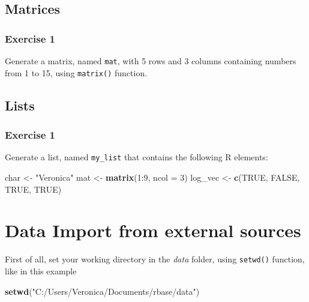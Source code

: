 \documentclass[]{book}
\newenvironment{Shaded}{\begin{snugshade}}{\end{snugshade}}
\newcommand{\KeywordTok}[1]{\textcolor[rgb]{0.13,0.29,0.53}{\textbf{{#1}}}}
\newcommand{\DataTypeTok}[1]{\textcolor[rgb]{0.13,0.29,0.53}{{#1}}}
\newcommand{\DecValTok}[1]{\textcolor[rgb]{0.00,0.00,0.81}{{#1}}}
\newcommand{\StringTok}[1]{\textcolor[rgb]{0.31,0.60,0.02}{{#1}}}
\newcommand{\OtherTok}[1]{\textcolor[rgb]{0.56,0.35,0.01}{{#1}}}
\newcommand{\NormalTok}[1]{{#1}}
\begin{document}
\section{Matrices}\label{matrices}

\subsection{Exercise 1}\label{exercise-1-3}

Generate a matrix, named \texttt{mat}, with 5 rows and 3 columns
containing numbers from 1 to 15, using \texttt{matrix()} function.

\section{Lists}\label{lists}

\subsection{Exercise 1}\label{exercise-1-4}

Generate a list, named \texttt{my\_list} that contains the following R
elements:

\begin{Shaded}
\begin{Highlighting}[]
\NormalTok{char <-}\StringTok{ "Veronica"}
\NormalTok{mat <-}\StringTok{ }\KeywordTok{matrix}\NormalTok{(}\DecValTok{1}\NormalTok{:}\DecValTok{9}\NormalTok{, }\DataTypeTok{ncol =} \DecValTok{3}\NormalTok{)}
\NormalTok{log_vec <-}\StringTok{ }\KeywordTok{c}\NormalTok{(}\OtherTok{TRUE}\NormalTok{, }\OtherTok{FALSE}\NormalTok{, }\OtherTok{TRUE}\NormalTok{, }\OtherTok{TRUE}\NormalTok{)}
\end{Highlighting}
\end{Shaded}

\chapter{Data Import from external
sources}\label{data-import-from-external-sources}

First of all, set your working directory in the \emph{data} folder,
using \texttt{setwd()} function, like in this example

\begin{Shaded}
\begin{Highlighting}[]
\KeywordTok{setwd}\NormalTok{(}\StringTok{"C:/Users/Veronica/Documents/rbase/data"}\NormalTok{)}
\end{Highlighting}
\end{Shaded}
\end{document}
